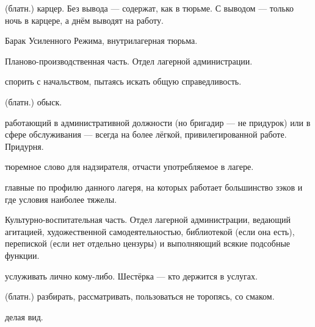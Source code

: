  (блатн.) карцер. {\tensl Без вывода\/} --- содержат, как в
тюрьме. {\tensl С выводом\/} --- только ночь в карцере, а днём выводят на работу.

 Барак Усиленного Режима, внутрилагерная тюрьма.

 Планово-производственная часть. Отдел лагерной администрации.

 спорить с начальством, пытаясь искать общую справедливость.

 (блатн.) обыск.

 работающий в административной должности (но бригадир --- не придурок) или в
сфере обслуживания --- всегда на более лёгкой, привилегированной работе. {\tensl Придурня}.

 тюремное слово для надзирателя, отчасти употребляемое в лагере.

 главные по профилю данного лагеря, на которых работает большинство зэков
и где условия наиболее тяжелы.

 Культурно-воспитательная часть. Отдел лагерной администрации, ведающий агитацией,
художественной самодеятельностью, библиотекой (если она есть), перепиской (если нет отдельно
цензуры) и выполняющий всякие подсобные функции.

 услуживать лично кому-либо. {\tensl Шестёрка\/} --- кто держится в услугах.

 (блатн.) разбирать, рассматривать, пользоваться не торопясь, со смаком.

 делая вид.

\bye
